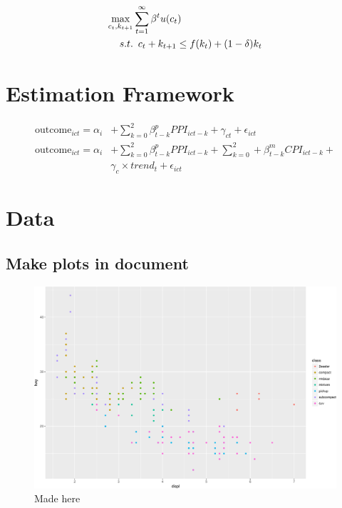 \documentclass[12pt,]{article}
\newcommand{\maximise}{\operatornamewithlimits{max}}
\begin{document}
\begin{align*}
\maximise_{c_t,k_{t+1}} &  \sum_{t=1}^{\infty} \beta^t u(c_t)  \\
  s.t. & \enspace c_{t} + k_{t+1} \leq f(k_t) + (1-\delta)k_t
\end{align*}

\hypertarget{estimation-framework}{%
\section{Estimation Framework}\label{estimation-framework}}

\begin{align*}
\text{outcome}_{ict} = \alpha_i & + \sum_{k=0}^2 \beta_{t-k}^p
PPI_{ict-k} + \gamma_{ct} + \epsilon_{ict} \\
\text{outcome}_{ict} = \alpha_i & + \sum_{k=0}^2 \beta_{t-k}^p PPI_{ict-k} +
\sum_{k=0}^2 + \beta_{t-k}^m CPI_{ict-k} + \\ & \gamma_{c}\times
trend_t + \epsilon_{ict}
\end{align*}

\hypertarget{data}{%
\section{Data}\label{data}}

\hypertarget{make-plots-in-document}{%
\subsection{Make plots in document}\label{make-plots-in-document}}

\begin{figure}
\centering
\includegraphics{Figs/unnamed-chunk-2-1.pdf}
\caption{Made here}
\end{figure}
\end{document}
